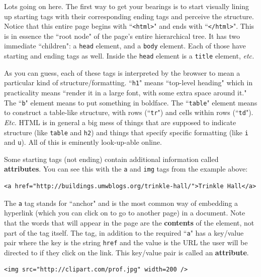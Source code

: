 \documentclass[12pt]{article}
\begin{document}
\vspace{.2in}
Lots going on here. The first way to get your bearings is to start visually
lining up starting tags with their corresponding ending tags and perceive the
structure. Notice that this entire page begins with ``\texttt{<html>}" and
ends with ``\texttt{</html>}". This is in essence the ``root node" of the
page's entire hierarchical tree. It has two immediate ``children": a
\texttt{head} element, and a \texttt{body} element. Each of those have
starting and ending tags as well. Inside the \texttt{head} element is a
\texttt{title} element, \textit{etc.}

As you can guess, each of these tags is interpreted by the browser to mean a
particular kind of structure/formatting. ``\texttt{h1}" means ``top-level
heading" which in practicality means ``render it in a large font, with some
extra space around it." The ``\texttt{b}" element means to put something in
boldface. The ``\texttt{table}" element means to construct a table-like
structure, with rows (``\texttt{tr}") and cells within rows (``\texttt{td}").
\textit{Etc.} HTML is in general a big mess of things that are supposed to
indicate structure (like \texttt{table} and \texttt{h2}) and things that
specify specific formatting (like \texttt{i} and \texttt{u}). All of this is
eminently look-up-able online.

Some starting tags (not ending) contain additional information called
\textbf{attributes}. You can see this with the \texttt{a} and \texttt{img}
tags from the example above:

\begin{Verbatim}[fontsize=\small,samepage=true,frame=none]
<a href="http://buildings.umwblogs.org/trinkle-hall/">Trinkle Hall</a>
\end{Verbatim}

The \texttt{a} tag stands for ``anchor" and is the most common way of
embedding a hyperlink (which you can click on to go to another page) in a
document. Note that the words that will appear in the page are the
\textbf{contents} of the element, not part of the tag itself. The tag, in
addition to the required ``\texttt{a}" has a key/value pair where the key is
the string \texttt{href} and the value is the URL the user will be directed to
if they click on the link. This key/value pair is called an
\textbf{attribute}.

\begin{Verbatim}[fontsize=\small,samepage=true,frame=none]
<img src="http://clipart.com/prof.jpg" width=200 />
\end{Verbatim}
\end{document}
